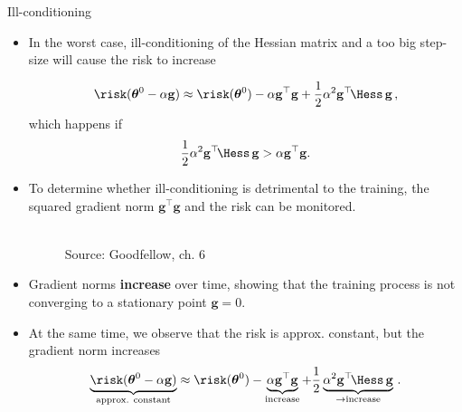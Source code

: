 \begin{vbframe} {Ill-conditioning}
\begin{itemize}
  \item In the worst case, ill-conditioning of the Hessian matrix and a too big step-size will cause the risk to increase

    $$
   \risk(\boldsymbol{\theta}^0-\alpha \mathbf{g}) \approx \risk(\boldsymbol{\theta}^0) - \alpha \mathbf{g}^\top\mathbf{g} + \frac{1}{2} \alpha^2 \mathbf{g}^\top\!\Hess\,\mathbf{g}  \,,
   $$ 
   which happens if 
   $$
    \frac{1}{2} \alpha^2 \mathbf{g}^\top\!\Hess\,\mathbf{g} > \alpha \mathbf{g}^\top\mathbf{g}.
   $$
    \item To determine whether ill-conditioning is detrimental to the training, the squared gradient norm $\mathbf{g}^\top \mathbf{g}$ and the risk %
    can be monitored.

    \begin{figure}
      \captionsetup{font=footnotesize,labelfont=footnotesize, labelfont = bf}
    \centering
      \tiny{\\Source: Goodfellow, ch. 6}
    \end{figure}

    \vspace*{-0.1cm}

    \item Gradient norms \textbf{increase} over time, showing that the training process is not converging to a stationary point $\mathbf{g} = 0$. 
    \item At the same time, we observe that the risk is approx. constant, but the gradient norm increases
    \vspace*{-0.2cm}
    $$
      \underbrace{\risk(\boldsymbol{\theta}^0-\alpha \mathbf{g})}_{\text{approx. constant}} \approx \risk(\boldsymbol{\theta}^0) - \underbrace{\alpha \mathbf{g}^\top\mathbf{g}}_{\text{increase}}+ \frac{1}{2}  \underbrace{\alpha^2 \mathbf{g}^\top\!\Hess\,\mathbf{g}}_{\to \text{increase}}  \,. 
     $$ 
  \end{itemize}
\end{vbframe}

